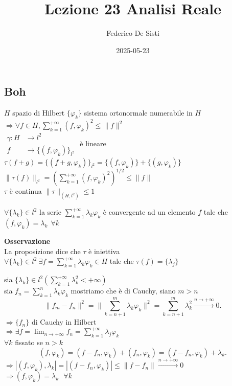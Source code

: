 \documentclass[12px]{article}
\title{Lezione 23 Analisi Reale}
\date{2025-05-23}
\author{Federico De Sisti}
\begin{document}
	\maketitle
	\newpage
	\subsection{Boh}
	$H$ spazio di Hilbert $\{ \varphi_k\}$ sistema ortonormale numerabile in $H$ $ \Rightarrow  \forall f\in H, \sum^{+\infty}_{k = 1}(f, \varphi_k)^2\leq \| f\|^2$\\
	$ \begin{aligned}
		\gamma: H &\rightarrow l^2\\
		f& \rightarrow \{(f, \varphi_k)\}_{l^2}
	\end{aligned}$
	è lineare $\tau(f + g) = \{(f + g, \varphi_k)\}_{l^2} = \{(f, \varphi_k)\} + \{(g, \varphi_k)\}$\\
	$\|\tau(f)\|_{l^2} = \left( \sum^{+\infty}_{k = 1}(f, \varphi_k)^2 \right)^{1/2}\leq \|f\|$\\
	$\tau$ è continua  $\|\tau\|_{(H,l^2)}\leq 1$
	 \begin{prop}
		 $\forall \{ \lambda_k\}\in l^2$ la serie $\sum^{+\infty}_{k = 1} \lambda _k \varphi_k$ è convergente ad un elemento $f$ tale che $(f, \varphi_k) = \lambda_k \ \ \forall k$\\
	\end{prop}
		 \textbf{Osservazione}\\
		 La proposizione dice che $\tau $ è iniettiva\\
		 $\forall \{ \lambda_k\}\in l^2 \ \exists f = \sum^{+\infty}_{k = 1} \lambda_k \varphi_k\in H$ tale che $\tau(f) = \{ \lambda_j\}$ \\
		 \begin{dimo}
			 sia $\{ \lambda_k\}\in l^2 ( \sum^{+\infty}_{k = 1} \lambda_k^2 < +\infty)$\\
			 sia  $f_n = \sum^{n}_{k= 1} \lambda_k \varphi_k$ mostriamo che è di Cauchy, siano $m > n$\\
			  \[
				  \|f_m-f_n\|^2 = \| \sum^{m}_{k = n + 1} \lambda_k \varphi_k\|^2 = \sum^{m}_{k = n+1} \lambda_k^2 \xrightarrow{ n \rightarrow +\infty} 0
			 .\] 
			 $ \Rightarrow  \{f_n\}$ di Cauchy in Hilbert\\
			 $ \Rightarrow  \exists f = \lim_{ n \rightarrow +\infty} f_n = \sum^{ + \infty}_{k =1} \lambda_j \varphi_k$\\
			 $\forall k$ fissato se  $n > k$\\
			  \[
				  (f, \varphi_k) = (f - f_n, \varphi_k) + (f_n, \varphi_k) = (f - f_n, \varphi_k) + \lambda_k
			 .\] 
			 $ \Rightarrow  |(f, \varphi_k), \lambda_k| = |(f-f_n, \varphi_k)| \leq \|f- f_n\| \xrightarrow{ n \rightarrow +\infty} 0 $\\
			 $ \Rightarrow  (f, \varphi_k) = \lambda_k \ \ \ \forall k$ \\
		 \end{dimo}
\end{document}
